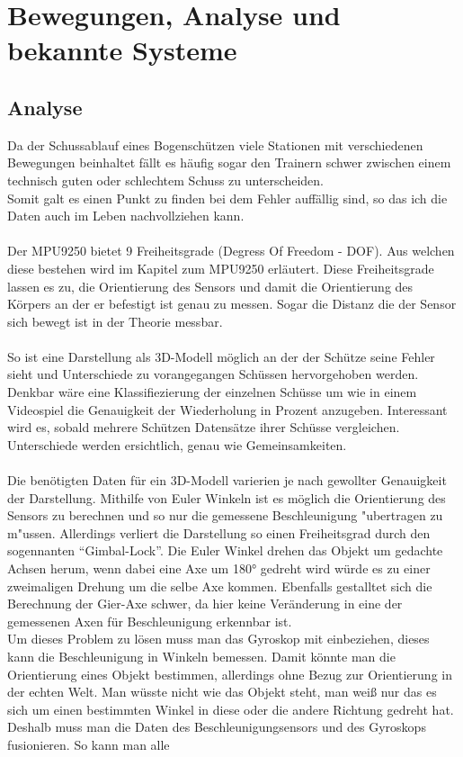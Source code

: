 \chapter{Bewegungen, Analyse und bekannte Systeme}
\section{Analyse}
Da der Schussablauf eines Bogenschützen viele Stationen mit verschiedenen Bewegungen 
beinhaltet fällt es häufig sogar den Trainern schwer zwischen einem technisch guten
oder schlechtem Schuss zu unterscheiden.\\ 
Somit galt es einen Punkt zu finden bei dem Fehler auffällig sind, so das ich die Daten auch im 
Leben nachvollziehen kann.\\
\\
Der MPU9250 bietet 9 Freiheitsgrade (Degress Of Freedom - DOF). Aus welchen diese bestehen wird
im Kapitel zum MPU9250 erläutert. Diese Freiheitsgrade lassen es zu, die Orientierung des Sensors 
und damit die Orientierung des Körpers an der er befestigt ist genau zu messen. Sogar die Distanz 
die der Sensor sich bewegt ist in der Theorie messbar.\\
\\
So ist eine Darstellung als 3D-Modell möglich an der der Schütze seine Fehler sieht und Unterschiede
zu vorangegangen Schüssen hervorgehoben werden. \\
Denkbar wäre eine Klassifiezierung der einzelnen Schüsse um wie in einem Videospiel die Genauigkeit
der Wiederholung in Prozent anzugeben. Interessant wird es, sobald mehrere Schützen Datensätze
ihrer Schüsse vergleichen. Unterschiede werden ersichtlich, genau wie Gemeinsamkeiten.\\
\\
Die benötigten Daten für ein 3D-Modell varierien je nach gewollter Genauigkeit der Darstellung.
Mithilfe von Euler Winkeln ist es möglich die Orientierung des Sensors zu berechnen und so nur
die gemessene Beschleunigung "ubertragen zu m"ussen. Allerdings verliert die Darstellung so einen
Freiheitsgrad durch den sogennanten ``Gimbal-Lock''. Die Euler Winkel drehen das Objekt um gedachte
Achsen herum, wenn dabei eine Axe um 180° gedreht wird würde es zu einer zweimaligen Drehung
um die selbe Axe kommen. Ebenfalls gestalltet sich die Berechnung der Gier-Axe schwer, da hier
keine Veränderung in eine der gemessenen Axen für Beschleunigung erkennbar ist.
\\
Um dieses Problem zu lösen muss man das Gyroskop mit einbeziehen, dieses kann die Beschleunigung
in Winkeln bemessen. Damit könnte man die Orientierung eines Objekt bestimmen, allerdings ohne 
Bezug zur Orientierung in der echten Welt. Man wüsste nicht wie das Objekt steht, man weiß nur 
das es sich um einen bestimmten Winkel in diese oder die andere Richtung gedreht hat. \\
Deshalb muss man die Daten des Beschleunigungsensors und des Gyroskops fusionieren. So kann man 
alle
\\
